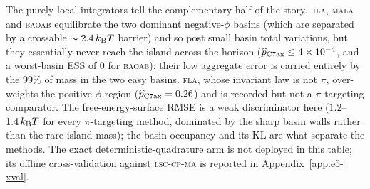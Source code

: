 \documentclass[11pt]{article}
\begin{document}
The purely local integrators tell the complementary half of the story.
\textsc{ula}, \textsc{mala} and \textsc{baoab} equilibrate the two dominant
negative-$\phi$ basins (which are separated by a crossable $\sim2.4\,k_{\rm B}T$
barrier) and so post small basin total variations, but they essentially never
reach the island across the horizon ($\widehat p_{\rm C7ax}\le4\times10^{-4}$,
and a worst-basin ESS of $0$ for \textsc{baoab}): their low aggregate error is
carried entirely by the $99\%$ of mass in the two easy basins.  \textsc{fla},
whose invariant law is not $\pi$, over-weights the positive-$\phi$ region
($\widehat p_{\rm C7ax}=0.26$) and is recorded but not a $\pi$-targeting
comparator.  The free-energy-surface RMSE is a weak discriminator here
($1.2$--$1.4\,k_{\rm B}T$ for every $\pi$-targeting method, dominated by the
sharp basin walls rather than the rare-island mass); the basin occupancy and its
KL are what separate the methods.  The exact deterministic-quadrature arm is not
deployed in this table; its offline cross-validation against \textsc{lsc-cp-ma}
is reported in Appendix~\ref{app:e5-xval}.
\end{document}

